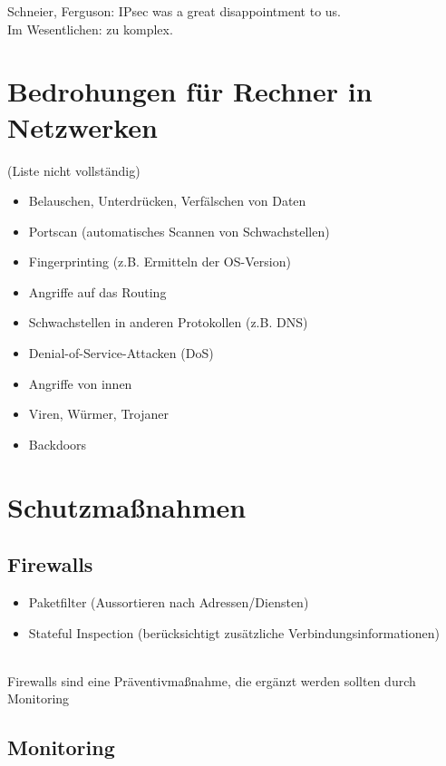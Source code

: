 \documentclass[a4paper,twoside,DIV15,BCOR12mm]{scrbook}
\begin{document}
Schneier, Ferguson: \glqq IPsec was a great disappointment to us.\grqq\\

Im Wesentlichen: zu komplex.

\section{Bedrohungen für Rechner in Netzwerken}

(Liste nicht vollständig)

\begin{itemize}
	\item Belauschen, Unterdrücken, Verfälschen von Daten
	\item Portscan (automatisches Scannen von Schwachstellen)
	\item Fingerprinting (z.B. Ermitteln der OS-Version)
	\item Angriffe auf das Routing
	\item Schwachstellen in anderen Protokollen (z.B. DNS)
	\item Denial-of-Service-Attacken (DoS)
	\item Angriffe von innen
	\item Viren, Würmer, Trojaner
	\item Backdoors
\end{itemize}

\section{Schutzmaßnahmen}

\subsection{Firewalls}

\begin{itemize}
	\item Paketfilter (Aussortieren nach Adressen/Diensten)
	\item Stateful Inspection (berücksichtigt zusätzliche Verbindungsinformationen)
\end{itemize}

\\

Firewalls sind eine Präventivmaßnahme, die ergänzt werden sollten durch Monitoring

\subsection{Monitoring}
\end{document}
